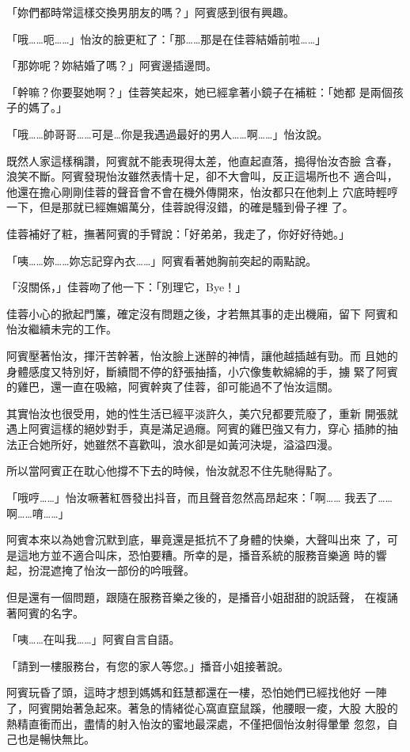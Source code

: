 「妳們都時常這樣交換男朋友的嗎？」阿賓感到很有興趣。

「哦……呃……」怡汝的臉更紅了：「那……那是在佳蓉結婚前啦……」

「那妳呢？妳結婚了嗎？」阿賓邊插邊問。

「幹嘛？你要娶她啊？」佳蓉笑起來，她已經拿著小鏡子在補粧：「她都
是兩個孩子的媽了。」

「哦……帥哥哥……可是…你是我遇過最好的男人……啊……」怡汝說。

既然人家這樣稱讚，阿賓就不能表現得太差，他直起直落，搗得怡汝杏臉
含春，浪笑不斷。阿賓發現怡汝雖然表情十足，卻不大會叫，反正這場所也不
適合叫，他還在擔心剛剛佳蓉的聲音會不會在機外傳開來，怡汝都只在他刺上
穴底時輕哼一下，但是那就已經嫵媚萬分，佳蓉說得沒錯，的確是騷到骨子裡
了。

佳蓉補好了粧，撫著阿賓的手臂說：「好弟弟，我走了，你好好待她。」

「咦……妳……妳忘記穿內衣……」阿賓看著她胸前突起的兩點說。

「沒關係，」佳蓉吻了他一下：「別理它，Bye！」

佳蓉小心的掀起門簾，確定沒有問題之後，才若無其事的走出機廂，留下
阿賓和怡汝繼續未完的工作。

阿賓壓著怡汝，揮汗苦幹著，怡汝臉上迷醉的神情，讓他越插越有勁。而
且她的身體感度又特別好，斷續間不停的舒張抽搐，小穴像隻軟綿綿的手，擄
緊了阿賓的雞巴，還一直在吸縮，阿賓幹爽了佳蓉，卻可能過不了怡汝這關。

其實怡汝也很受用，她的性生活已經平淡許久，美穴兒都要荒廢了，重新
開張就遇上阿賓這樣的絕妙對手，真是滿足過癮。阿賓的雞巴強又有力，穿心
插肺的抽法正合她所好，她雖然不喜歡叫，浪水卻是如黃河決堤，溢溢四漫。

所以當阿賓正在耽心他撐不下去的時候，怡汝就忍不住先馳得點了。

「哦哼……」怡汝噘著紅唇發出抖音，而且聲音忽然高昂起來：「啊……
我丟了……啊……唷……」

阿賓本來以為她會沉默到底，畢竟還是抵抗不了身體的快樂，大聲叫出來
了，可是這地方並不適合叫床，恐怕要糟。所幸的是，播音系統的服務音樂適
時的響起，扮混遮掩了怡汝一部份的吟哦聲。

但是還有一個問題，跟隨在服務音樂之後的，是播音小姐甜甜的說話聲，
在複誦著阿賓的名字。

「咦……在叫我……」阿賓自言自語。

「請到一樓服務台，有您的家人等您。」播音小姐接著說。

阿賓玩昏了頭，這時才想到媽媽和鈺慧都還在一樓，恐怕她們已經找他好
一陣了，阿賓開始著急起來。著急的情緒從心窩直竄鼠蹊，他腰眼一痠，大股
大股的熱精直衝而出，盡情的射入怡汝的蜜地最深處，不僅把個怡汝射得暈暈
忽忽，自己也是暢快無比。


